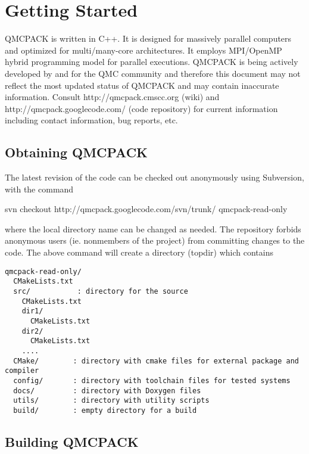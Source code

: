 \chapter{Getting Started}
QMCPACK is written in C++. It is designed for massively parallel computers and
optimized for multi/many-core architectures.  It employs MPI/OpenMP hybrid
programming model for parallel executions. QMCPACK is being actively developed
by and for the QMC community and therefore this document may not reflect the most
updated status of QMCPACK and may contain inaccurate information.
Consult http://qmcpack.cmscc.org (wiki) and  http://qmcpack.googlecode.com/ (code
repository)  for current information including contact information, bug reports, etc. 
\section{Obtaining QMCPACK}
The latest revision of the code can
be checked out anonymously using Subversion, with the command
\begin{term}
svn checkout http://qmcpack.googlecode.com/svn/trunk/ qmcpack-read-only
\end{term}
where the local directory name  can be changed as
needed.  The repository forbids anonymous users (ie. nonmembers of the project)
from committing changes to the code.  The above command will create a directory
 (topdir) which contains
\begin{verbatim} 
qmcpack-read-only/
  CMakeLists.txt
  src/           : directory for the source
    CMakeLists.txt
    dir1/
      CMakeLists.txt
    dir2/
      CMakeLists.txt
    ....
  CMake/        : directory with cmake files for external package and compiler
  config/       : directory with toolchain files for tested systems
  docs/         : directory with Doxygen files
  utils/        : directory with utility scripts
  build/        : empty directory for a build 
\end{verbatim}

\section{Building QMCPACK}

